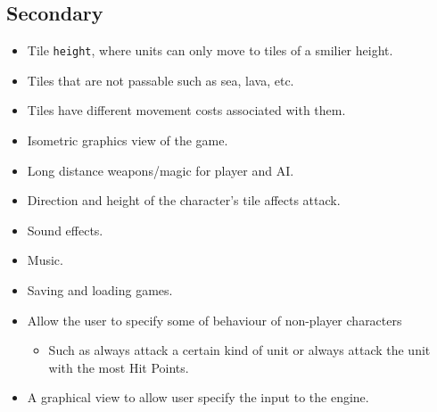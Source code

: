 \subsection{Secondary} 
\label{secondary}
\begin{itemize}
	\item Tile \texttt{height}, where units can only move to tiles of a smilier height.
	
	\item Tiles that are not passable such as sea, lava, etc.
	
	\item Tiles have different movement costs associated with them.
	
	\item Isometric graphics view of the game.
	
	\item Long distance weapons\slash magic for player and AI.
	
	\item Direction and height of the character's tile affects attack.
	
	\item Sound effects.
	
	\item Music.
	
	\item Saving and loading games.
	
	\item Allow the user to specify some of behaviour of non-player characters
	\begin{itemize}
		\item Such as always attack a certain kind of unit or always attack the unit with the most Hit Points.
	\end{itemize}
	
	\item A graphical view to allow user specify the input to the engine.
\end{itemize}

